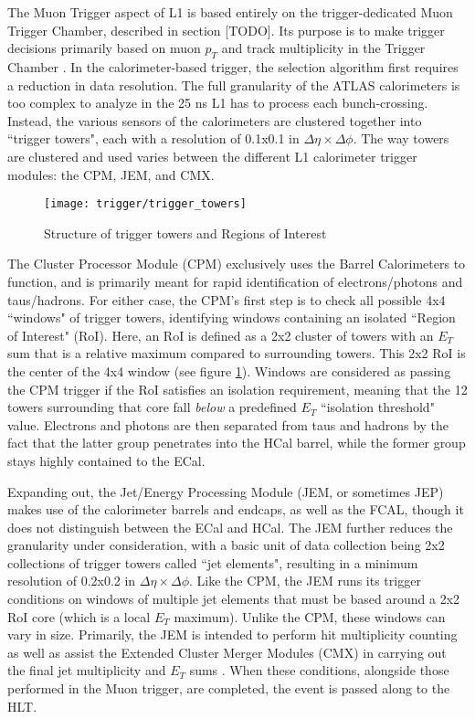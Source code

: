     The Muon Trigger aspect of L1 is based entirely on the trigger-dedicated Muon Trigger Chamber, described in section [TODO]. %
    Its purpose is to make trigger decisions primarily based on muon $p_T$ and track multiplicity in the Trigger Chamber \cite{trigger_run1}.
    In the calorimeter-based trigger, the selection algorithm first requires a reduction in data resolution.
    The full granularity of the ATLAS calorimeters is too complex to analyze in the 25 ns L1 has to process each bunch-crossing.
    Instead, the various sensors of the calorimeters are clustered together into ``trigger towers", each with a resolution of 0.1x0.1 in $\Delta \eta \times \Delta \phi$.
    The way towers are clustered and used varies between the different L1 calorimeter trigger modules: the CPM, JEM, and CMX.

    \begin{figure}[h]
        \texttt{[image: trigger/trigger\_towers]}
        \caption{Structure of trigger towers and Regions of Interest \cite{L1_calo_run1}}
        \label{fig:trigger_towers}
    \end{figure}


    The Cluster Processor Module (CPM) exclusively uses the Barrel Calorimeters to function, and is primarily meant for rapid identification of electrons/photons and taus/hadrons.
    For either case, the CPM's first step is to check all possible 4x4 ``windows" of trigger towers, identifying windows containing an isolated ``Region of Interest" (RoI).
    Here, an RoI is defined as a 2x2 cluster of towers with an $E_T$ sum that is a relative maximum compared to surrounding towers.
    This 2x2 RoI is the center of the 4x4 window (see figure \ref{fig:trigger_towers}).
    Windows are considered as passing the CPM trigger if the RoI satisfies an isolation requirement, meaning that the 12 towers surrounding that core fall \textit{below} a predefined $E_T$ ``isolation threshold" value.
    Electrons and photons are then separated from taus and hadrons by the fact that the latter group penetrates into the HCal barrel, while the former group stays highly contained to the ECal.

    Expanding out, the Jet/Energy Processing Module (JEM, or sometimes JEP) makes use of the calorimeter barrels and endcaps, as well as the FCAL, though it does not distinguish between the ECal and HCal.
    The JEM further reduces the granularity under consideration, with a basic unit of data collection being 2x2 collections of trigger towers called ``jet elements", resulting in a minimum resolution of 0.2x0.2 in $\Delta \eta \times \Delta \phi$.
    Like the CPM, the JEM runs its trigger conditions on windows of multiple jet elements that must be based around a 2x2 RoI core (which is a local $E_T$ maximum).
    Unlike the CPM, these windows can vary in size.
    Primarily, the JEM is intended to perform hit multiplicity counting as well as assist the Extended Cluster Merger Modules (CMX) in carrying out the final jet multiplicity and $E_T$ sums \cite{L1_calo_run1}\cite{trigger_run2}.
    When these conditions, alongside those performed in the Muon trigger, are completed, the event is passed along to the HLT.


